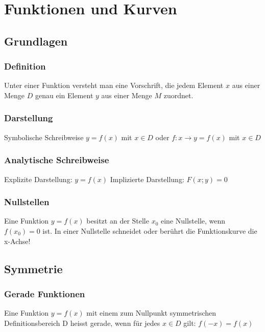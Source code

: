 \chapter{Funktionen und Kurven}
\section{Grundlagen}
\subsection{Definition}
Unter einer Funktion versteht man eine Vorschrift, die jedem Element \(x\) aus einer Menge \(D\) genau ein Element \(y\) aus einer Menge \(M\) zuordnet.

\subsection{Darstellung}
Symbolische Schreibweise
\newline \(y = f(x)\) mit \(x \in D\) oder
\newline \(f: x \rightarrow y = f(x)\) mit \(x \in D\)

\subsection{Analytische Schreibweise}
Explizite Darstellung: \(y = f (x) \)
\newline Implizierte Darstellung: \(F(x;y) = 0\)

\subsection{Nullstellen} %
\label{sec:nullstellen}
Eine Funktion \(y = f(x)\) besitzt an der Stelle \(x_{0}\) eine Nullstelle, wenn \(f(x_{0}) = 0\) ist.
\newline In einer Nullstelle schneidet oder berührt die Funktionskurve die x-Achse!

\section{Symmetrie} %
\subsection{Gerade Funktionen} %
Eine Funktion \(y = f(x)\) mit einem zum Nullpunkt symmetrischen Definitionsbereich D heisst gerade, wenn für jedes \(x \in D\) gilt:
\newline \(f(-x) = f(x)\)


